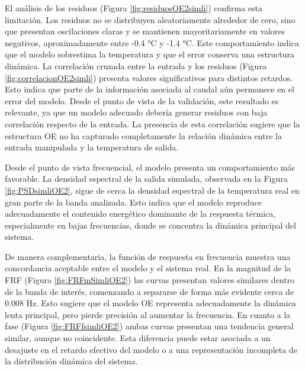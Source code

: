 \documentclass[11pt]{report}
\begin{document}
El análisis de los residuos (Figura \ref{fig:residuosOE2simli}) confirma esta limitación. Los residuos no se distribuyen aleatoriamente alrededor de cero, sino que presentan oscilaciones claras y se mantienen mayoritariamente en valores negativos, aproximadamente entre -0.4 °C y -1.4 °C. Este comportamiento indica que el modelo sobrestima la temperatura y que el error conserva una estructura dinámica. 
La correlación cruzada entre la entrada y los residuos (Figura \ref{fig:correlacionOE2simli}) presenta valores significativos para distintos retardos. Esto indica que parte de la información asociada al caudal aún permanece en el error del modelo. Desde el punto de vista de la validación, este resultado es relevante, ya que un modelo adecuado debería generar residuos con baja correlación respecto de la entrada. La presencia de esta correlación sugiere que la estructura OE no ha capturado completamente la relación dinámica entre la entrada manipulada y la temperatura de salida.

Desde el punto de vista frecuencial, el modelo presenta un comportamiento más favorable. La densidad espectral de la salida simulada, observada en la Figura \ref{fig:PSDsimliOE2}, sigue de cerca la densidad espectral de la temperatura real en gran parte de la banda analizada. Esto indica que el modelo reproduce adecuadamente el contenido energético dominante de la respuesta térmica, especialmente en bajas frecuencias, donde se concentra la dinámica principal del sistema.

De manera complementaria, la función de respuesta en frecuencia muestra una concordancia aceptable entre el modelo y el sistema real. En la magnitud de la FRF (Figura \ref{fig:FRFmSimliOE2}) las curvas presentan valores similares dentro de la banda de interés, comenzando a separarse de forma más evidente cerca de 0.008 Hz. Esto sugiere que el modelo OE representa adecuadamente la dinámica lenta principal, pero pierde precisión al aumentar la frecuencia. En cuanto a la fase (Figura \ref{fig:FRFfsimliOE2}) ambas curvas presentan una tendencia general similar, aunque no coincidente. Esta diferencia puede estar asociada a un desajuste en el retardo efectivo del modelo o a una representación incompleta de la distribución dinámica del sistema.
\end{document}
